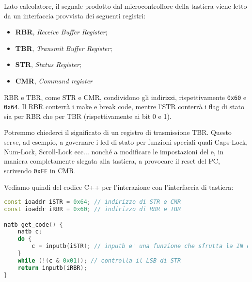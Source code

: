 \documentclass[a4paper,11pt]{article}
\begin{document}
Lato calcolatore, il segnale prodotto dal microcontrollore della tastiera viene letto da un interfaccia provvista dei seguenti registri:
\begin{itemize}
	\item \textbf{RBR}, \textit{Receive Buffer Register};
	\item \textbf{TBR}, \textit{Transmit Buffer Register};
	\item \textbf{STR}, \textit{Status Register};
	\item \textbf{CMR}, \textit{Command register}
\end{itemize}

RBR e TBR, come STR e CMR, condividono gli indirizzi, rispettivamente \lstinline|0x60| e \lstinline|0x64|.
Il RBR conterrà i make e break code, mentre l'STR conterrà i flag di stato sia per RBR che per TBR (rispettivamente ai bit 0 e 1).

Potremmo chiederci il significato di un registro di trasmissione TBR.
Questo serve, ad esempio, a governare i led di stato per funzioni speciali quali Caps-Lock, Num-Lock, Scroll-Lock ecc... nonché a modificare le impostazioni del  e, in maniera completamente slegata alla tastiera, a provocare il reset del PC, scrivendo \lstinline|0xFE| in CMR.

Vediamo quindi del codice C++ per l'interazione con l'interfaccia di tastiera:
\begin{lstlisting}[language=C++, style=codestyle]	
const ioaddr iSTR = 0x64; // indirizzo di STR e CMR
const ioaddr iRBR = 0x60; // indirizzo di RBR e TBR

natb get_code() {
	natb c;
	do {
		c = inputb(iSTR); // inputb e' una funzione che sfrutta la IN dell'asm
	}
	while (!(c & 0x01)); // controlla il LSB di STR
	return inputb(iRBR);
}
\end{lstlisting}
\end{document}
